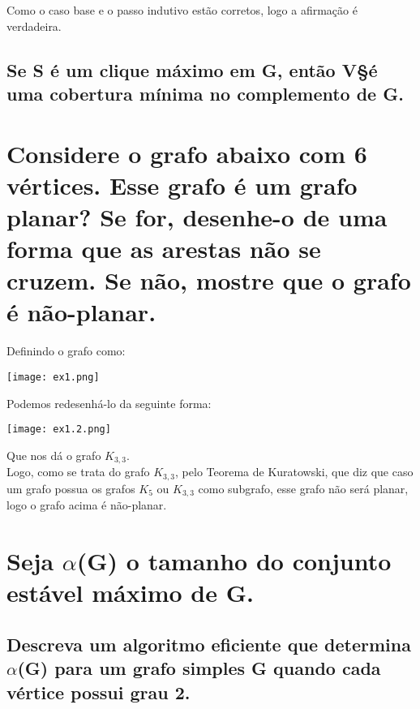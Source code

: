 \documentclass[12pt]{article}
\begin{document}
Como o caso base e o passo indutivo estão corretos, logo a afirmação é verdadeira.

\subsection{Se S é um clique máximo em G, então V\S é uma cobertura mínima no complemento de G.}




 







\section{Considere o grafo abaixo com 6 vértices. Esse grafo é um grafo planar? Se for, desenhe-o
de uma forma que as arestas não se cruzem. Se não, mostre que o grafo é não-planar.}
Definindo o grafo como:


\begin{center}
    \texttt{[image: ex1.png]}
\end{center}

Podemos redesenhá-lo da seguinte forma:


\begin{center}
    \texttt{[image: ex1.2.png]}
\end{center}

Que nos dá o grafo $K_{3,3}$. \\

Logo, como se trata do grafo $K_{3,3}$, pelo Teorema de Kuratowski, que diz que caso um grafo possua os grafos $K_5$ ou $K_{3,3}$ como subgrafo, esse grafo não será planar, logo o grafo acima é não-planar.




\section{Seja $\alpha$(G) o tamanho do conjunto estável máximo de G.}
\subsection{Descreva um algoritmo eficiente que determina $\alpha$(G) para um grafo simples G quando cada vértice possui grau 2.}
\end{document}
